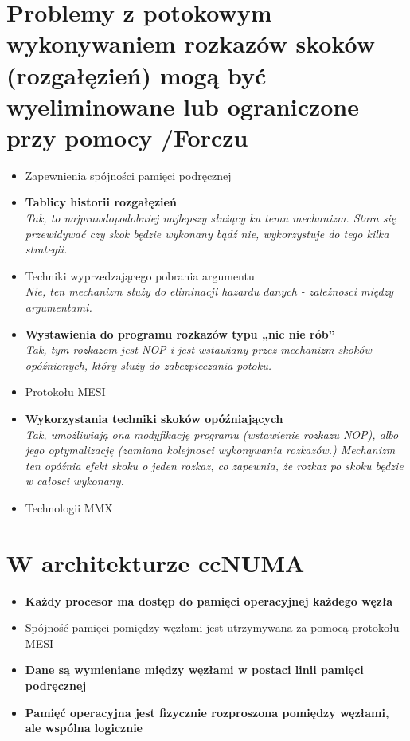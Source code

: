 \documentclass[a4paper,twoside]{article}
\begin{document}
\section{Problemy z potokowym wykonywaniem rozkazów skoków (rozgałęzień) mogą być wyeliminowane lub ograniczone przy pomocy {\small /Forczu}}
	\begin{itemize}
    \item Zapewnienia spójności pamięci podręcznej
    \item \textbf{Tablicy historii rozgałęzień}\\
    {\small \emph{Tak, to najprawdopodobniej najlepszy służący ku temu mechanizm. Stara się przewidywać czy skok będzie wykonany bądź nie, wykorzystuje do tego kilka strategii.}}
    \item Techniki wyprzedzającego pobrania argumentu\\
    {\small \emph{Nie, ten mechanizm służy do eliminacji hazardu danych - zależnosci między argumentami.}}
    \item \textbf{Wystawienia do programu rozkazów typu „nic nie rób”}\\
    {\small \emph{Tak, tym rozkazem jest \emph{NOP} i jest wstawiany przez mechanizm skoków opóźnionych, który służy do zabezpieczania potoku.}}
    \item Protokołu MESI
    \item \textbf{Wykorzystania techniki skoków opóźniających}\\
    {\small \emph{Tak, umożliwiają ona modyfikację programu (wstawienie rozkazu NOP), albo jego optymalizację (zamiana kolejnosci wykonywania rozkazów.) Mechanizm ten opóźnia efekt skoku o jeden rozkaz, co zapewnia, że rozkaz po skoku będzie w całosci wykonany.}}
    \item Technologii MMX
    \end{itemize}

\section{W architekturze ccNUMA}
	\begin{itemize}
    \item \textbf{Każdy procesor ma dostęp do pamięci operacyjnej każdego węzła}
    \item Spójność pamięci pomiędzy węzłami jest utrzymywana za pomocą protokołu MESI
    \item \textbf{Dane są wymieniane między węzłami w postaci linii pamięci podręcznej}
    \item \textbf{Pamięć operacyjna jest fizycznie rozproszona pomiędzy węzłami, ale wspólna logicznie}
    \end{itemize}
\end{document}
